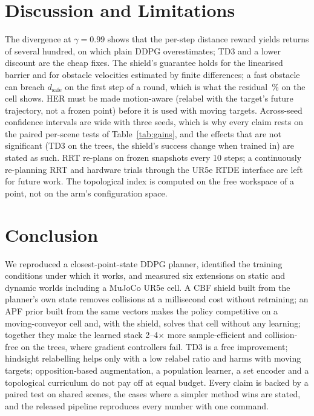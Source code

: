 \documentclass[conference]{IEEEtran}
\begin{document}
\section{Discussion and Limitations}
The divergence at $\gamma=0.99$ shows that the per-step distance reward yields returns of several hundred, on which plain DDPG overestimates; TD3 and a lower discount are the cheap fixes. The shield's guarantee holds for the linearised barrier and for obstacle velocities estimated by finite differences; a fast obstacle can breach $d_{\mathrm{safe}}$ on the first step of a round, which is what the residual \Curetdherapfshield{}\,\% on the cell shows. HER must be made motion-aware (relabel with the target's future trajectory, not a frozen point) before it is used with moving targets. Across-seed confidence intervals are wide with three seeds, which is why every claim rests on the paired per-scene tests of Table~\ref{tab:gains}, and the effects that are not significant (TD3 on the trees, the shield's success change when trained in) are stated as such. RRT re-plans on frozen snapshots every 10 steps; a continuously re-planning RRT and hardware trials through the UR5e RTDE interface are left for future work. The topological index is computed on the free workspace of a point, not on the arm's configuration space.

\section{Conclusion}
We reproduced a closest-point-state DDPG planner, identified the training conditions under which it works, and measured six extensions on static and dynamic worlds including a MuJoCo UR5e cell. A CBF shield built from the planner's own state removes collisions at a millisecond cost without retraining; an APF prior built from the same vectors makes the policy competitive on a moving-conveyor cell and, with the shield, solves that cell without any learning; together they make the learned stack 2--4$\times$ more sample-efficient and collision-free on the trees, where gradient controllers fail. TD3 is a free improvement; hindsight relabelling helps only with a low relabel ratio and harms with moving targets; opposition-based augmentation, a population learner, a set encoder and a topological curriculum do not pay off at equal budget. Every claim is backed by a paired test on shared scenes, the cases where a simpler method wins are stated, and the released pipeline reproduces every number with one command.
\end{document}
